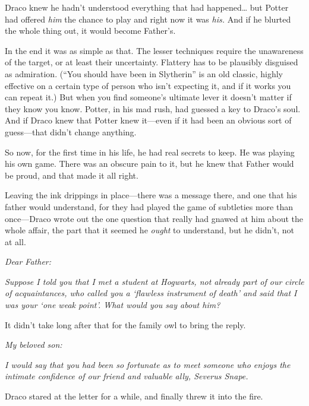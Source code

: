 Draco knew he hadn't understood everything that had happened\ldots{} but
Potter had offered \emph{him} the chance to play and right now it was
\emph{his.} And if he blurted the whole thing out, it would become
Father's.

In the end it was as simple as that. The lesser techniques require the
unawareness of the target, or at least their uncertainty. Flattery has
to be plausibly disguised as admiration. (``You should have been in
Slytherin'' is an old classic, highly effective on a certain type of
person who isn't expecting it, and if it works you can repeat it.) But
when you find someone's ultimate lever it doesn't matter if they know
you know. Potter, in his mad rush, had guessed a key to Draco's soul.
And if Draco knew that Potter knew it---even if it had been an obvious
sort of guess---that didn't change anything.

So now, for the first time in his life, he had real secrets to keep. He
was playing his own game. There was an obscure pain to it, but he knew
that Father would be proud, and that made it all right.

Leaving the ink drippings in place---there was a message there, and one
that his father would understand, for they had played the game of
subtleties more than once---Draco wrote out the one question that really
had gnawed at him about the whole affair, the part that it seemed he
\emph{ought} to understand, but he didn't, not at all.

\emph{Dear Father:}

\emph{Suppose I told you that I met a student at Hogwarts, not already
part of our circle of acquaintances, who called you a `flawless
instrument of death' and said that I was your `one weak point'. What
would you say about him?}

It didn't take long after that for the family owl to bring the reply.

\emph{My beloved son:}

\emph{I would say that you had been so fortunate as to meet someone who
enjoys the intimate confidence of our friend and valuable ally, Severus
Snape.}

Draco stared at the letter for a while, and finally threw it into the
fire.

